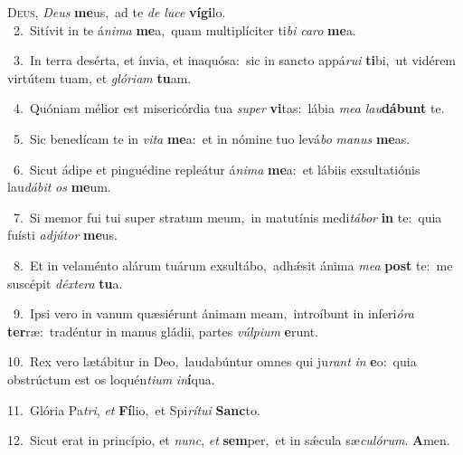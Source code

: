 \lettrine{\initial\textcolor{\initialcolor}{D}}{eus,} \textit{De}\-\textit{us} \textbf{me}\-us,~\star ad te \textit{de} \textit{lu}\-\textit{ce} \textbf{ví}\-\textbf{gi}lo.\\
{\numbfont\textcolor{\numbcolor}{~2.}}~Sitívit in te á\-\textit{ni}\-\textit{ma} \textbf{me}\-a,~\star quam multiplíciter ti\textit{bi} \textit{ca}\-\textit{ro} \textbf{me}\-a.\par
{\numbfont\textcolor{\numbcolor}{~3.}}~In terra desérta, et ínvia, et inaquósa:~\dagger sic in sancto appá\-\textit{ru}\-\textit{i} \textbf{ti}\-bi,~\star ut vidérem virtútem tuam, et \textit{gló}\-\textit{ri}\textit{am} \textbf{tu}\-am.\par
{\numbfont\textcolor{\numbcolor}{~4.}}~Quóniam mélior est misericórdia tua \textit{su}\-\textit{per} \textbf{vi}\-tas:~\star lábia \textit{me}\-\textit{a} \textit{lau}\-\textbf{dá}\textbf{bunt} te.\par
{\numbfont\textcolor{\numbcolor}{~5.}}~Sic benedícam te in \textit{vi}\-\textit{ta} \textbf{me}\-a:~\star et in nómine tuo levá\textit{bo} \textit{ma}\-\textit{nus} \textbf{me}\-as.\par
{\numbfont\textcolor{\numbcolor}{~6.}}~Sicut ádipe et pinguédine repleátur á\-\textit{ni}\-\textit{ma} \textbf{me}\-a:~\star et lábiis exsultatiónis lau\-\textit{dá}\-\textit{bit} \textit{os} \textbf{me}\-um.\par
{\numbfont\textcolor{\numbcolor}{~7.}}~Si memor fui tui super stratum meum,~\dagger in matutínis medi\-\textit{tá}\-\textit{bor} \textbf{in} te:~\star quia fuísti \textit{ad}\-\textit{jú}\textit{tor} \textbf{me}\-us.\par
{\numbfont\textcolor{\numbcolor}{~8.}}~Et in velaménto alárum tuárum exsultábo,~\dagger adhǽsit ánima \textit{me}\-\textit{a} \textbf{post} te:~\star me suscépit \textit{déx}\-\textit{te}\textit{ra} \textbf{tu}\-a.\par
{\numbfont\textcolor{\numbcolor}{~9.}}~Ipsi vero in vanum quæsiérunt ánimam meam,~\dagger introíbunt in inferi\-\textit{ó}\-\textit{ra} \textbf{ter}\-ræ:~\star tradéntur in manus gládii, partes \textit{vúl}\-\textit{pi}\textit{um} \textbf{e}\-runt.\par
{\numbfont\textcolor{\numbcolor}{10.}}~Rex vero lætábitur in Deo,~\dagger laudabúntur omnes qui ju\textit{rant} \textit{in} \textbf{e}\-o:~\star quia obstrúctum est os loquén\-\textit{ti}\-\textit{um} \textit{in}\-\textbf{í}qua.\par
{\numbfont\textcolor{\numbcolor}{11.}}~Glória Pa\-\textit{tri}\-, \textit{et} \textbf{Fí}\-lio,~\star et Spi\-\textit{rí}\-\textit{tu}\textit{i} \textbf{Sanc}\-to.\par
{\numbfont\textcolor{\numbcolor}{12.}}~Sicut erat in princípio, et \textit{nunc}\-, \textit{et} \textbf{sem}\-per,~\star et in sǽcula sæ\-\textit{cu}\-\textit{ló}\textit{rum}. \textbf{A}\-men.\par
